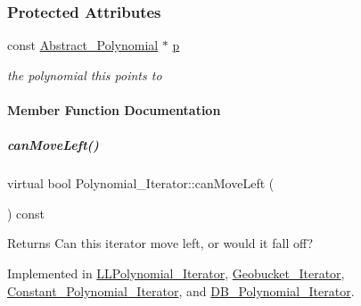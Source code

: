 \subsubsection*{Protected Attributes}
\begin{DoxyCompactItemize}
\item 
\mbox{\label{group___iterator_group_ab35e9b9c4d7ed12dabce5057a4c2a1b5}} 
const \hyperlink{group__polygroup_class_abstract___polynomial}{Abstract\+\_\+\+Polynomial} $\ast$ \hyperlink{group___iterator_group_ab35e9b9c4d7ed12dabce5057a4c2a1b5}{p}
\begin{DoxyCompactList}\small\item\em the polynomial {\ttfamily this} points to \end{DoxyCompactList}\end{DoxyCompactItemize}


\paragraph{Member Function Documentation}
\mbox{\label{group___iterator_group_a7ab348897446bc182500f84df8a9e590}} 
\subparagraph{\texorpdfstring{can\+Move\+Left()}{canMoveLeft()}}
{\footnotesize\ttfamily virtual bool Polynomial\+\_\+\+Iterator\+::can\+Move\+Left (\begin{DoxyParamCaption}{ }\end{DoxyParamCaption}) const\hspace{0.3cm}{\ttfamily [pure virtual]}}

\begin{DoxyReturn}{Returns}
Can this iterator move left, or would it fall off? 
\end{DoxyReturn}


Implemented in \hyperlink{group___iterator_group_a2df38ef3fd64b5e90432c754ce21f0c4}{L\+L\+Polynomial\+\_\+\+Iterator}, \hyperlink{group___iterator_group_a6c3db5961d5faf1b465c51e8935e0b89}{Geobucket\+\_\+\+Iterator}, \hyperlink{group___iterator_group_ade22e36aead8eca568dbd99c6ab73cc2}{Constant\+\_\+\+Polynomial\+\_\+\+Iterator}, and \hyperlink{group___iterator_group_a4094a88fd6d77894ff04960efd492ec6}{D\+B\+\_\+\+Polynomial\+\_\+\+Iterator}.

